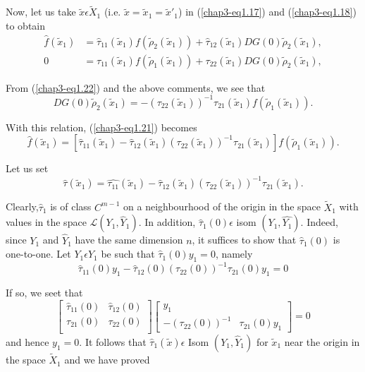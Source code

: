 Now, let us take $\widetilde{x} \epsilon \widetilde{X}_{1}$
(i.e. $\widetilde{x} = \widetilde{x}_{1} = \widetilde{x}'_{1}$) in
(\ref{chap3-eq1.17}) and (\ref{chap3-eq1.18}) to obtain
\begin{align*}
\hat{f}(\widetilde{x}_{1}) & = \hat{\tau}_{11}(\widetilde{x}_{1})
f(\widetilde{\rho}_{2}(\widetilde{x}_{1})) +
\hat{\tau}_{12}(\widetilde{x}_{1}) DG(0)
\widetilde{\rho}_{2}(\widetilde{x}_{1}),\tag{1.21}\label{chap3-eq1.21}\\
 0  & = \tau_{11}(\widetilde{x}_{1})
f(\widetilde{\rho}_{1}(\widetilde{x}_{1})) +
\tau_{22}(\widetilde{x}_{1}) DG(0)
\widetilde{\rho}_{2}(\widetilde{x}_{1}),\tag{1.22}\label{chap3-eq1.22}
\end{align*}

From (\ref{chap3-eq1.22}) and the above comments, we see that
$$
DG(0) \widetilde{\rho}_{2}(\widetilde{x}_{1}) =
-(\tau_{22}(\widetilde{x}_{1}))^{-1} \tau_{21}(\widetilde{x}_{1}) f(\widetilde{\rho}_{1}(\widetilde{x}_{1})).
$$

With this relation, (\ref{chap3-eq1.21}) becomes
$$
\hat{f}(\widetilde{x}_{1}) = \left[\hat{\tau}_{11} (\widetilde{x}_{1})
- \hat{\tau}_{12}
(\widetilde{x}_{1})(\tau_{22}(\widetilde{x}_{1}))^{-1}
\tau_{21}(\widetilde{x}_{1})\right] f(\widetilde{\rho}_{1}(\widetilde{x}_{1})).
$$

Let us set
$$
\hat{\tau}(\widetilde{x}_{1}) = \hat{\tau_{11}}(\widetilde{x}_{1}) -
\hat{\tau}_{12}(\widetilde{x}_{1})(\tau_{22}(\widetilde{x}_{1}))^{-1} \tau_{21}(\widetilde{x}_{1}).
$$

Clearly,\pageoriginale $\hat{\tau}_{1}$ is of class $C^{m-1}$ on a
neighbourhood of the origin in the space $\widetilde{X}_{1}$ with
values in the space $\mathscr{L}(Y_{1}, \hat{Y}_{1})$. In addition,
$\hat{\tau}_{1}(0) \epsilon$ isom $(Y_{1}, \hat{Y_{1}})$. Indeed,
since $Y_{1}$ and $\hat{Y}_{1}$ have the same dimension $n$, it suffices
to show that $\hat{\tau}_{1} (0)$ is one-to-one. Let $Y_{1} \epsilon
Y_{1}$ be such that $\hat{\tau}_{1} (0)y_{1} = 0$, namely
$$
\hat{\tau}_{11}(0)y_{1} - \hat{\tau}_{12}(0)(\tau_{22}(0))^{-1}
\tau_{21}(0)y_{1} = 0
$$

If so, we seet that
\begin{equation*}
\begin{bmatrix}
\hat{\tau}_{11}(0) & \hat{\tau}_{12}(0)\\
\tau_{21}(0) & \tau_{22}(0)\\
\end{bmatrix}
\begin{bmatrix}
y_{1} & \\
- \left(\tau_{22}(0) \right)^{-1} & \tau_{21}(0)y_{1}
\end{bmatrix}
= 0
\end{equation*}
and hence $y_{1} = 0$. It follows that $\hat{\tau}_{1}(\widetilde{x})
\epsilon$ Isom $(Y_{1}, \hat{Y}_{1})$ for $\widetilde{x}_{1}$ near the
origin in the space $\widetilde{X}_{1}$ and we have proved

